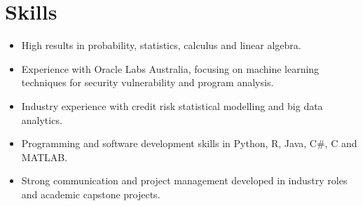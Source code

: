 \section*{Skills}

\begin{itemize}
    \setlength\itemsep{0.1em}
    \item High results in probability, statistics, calculus and linear algebra.
    \item Experience with Oracle Labs Australia, focusing on machine learning techniques for security vulnerability and program analysis.
    \item Industry experience with credit risk statistical modelling and big data analytics.
    \item Programming and software development skills in Python, R, Java, C\#, C and MATLAB.
    \item Strong communication and project management developed in industry roles and academic capstone projects.
\end{itemize}